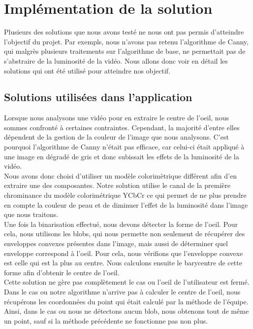 \section{Implémentation de la solution}
Plusieurs des solutions que nous avons testé ne nous ont pas permis d'atteindre l'objectif du projet.
Par exempls, nous n'avons pas retenu l'algorithme de Canny, qui malgrès plusieurs traitements sur l'algorithme
de base, ne permettait pas de s'abstraire de la luminosité de la vidéo.
Nous allons donc voir en détail les solutions qui ont été utilisé pour atteindre nos objectif.

\subsection{Solutions utilisées dans l'application}
Lorsque nous analysons une vidéo pour en extraire le centre de l'oeil, nous sommes confronté à certaines contraintes.
Cependant, la majorité d'entre elles dépendent de la gestion de la couleur de l'image que nous analysons. C'est
pourquoi l'algorithme de Canny n'était pas efficace, car celui-ci était appliqué à une image en dégradé de gris
et donc subissait les effets de la luminosité de la vidéo.\\

Nous avons donc choisi d'utiliser un modèle colorimètrique différent afin d'en extraire une des composantes.
Notre solution utilise le canal de la première chrominance du modèle colorimétrique YCbCr ce qui permet 
de ne plus prendre en compte la couleur de peau et de diminuer l'effet de la luminosité dans l'image que nous traitons.\\


Une fois la binarisation effectué, nous devons détecter la forme de l'oeil. Pour cela, nous utilisons les blobs, qui nous
permette non seulement de récupérer des enveloppes convexes présentes dans l'image, mais aussi de déterminer quel enveloppe
correspond à l'oeil. Pour cela, nous vérifions que l'enveloppe convexe est celle qui est la plus au centre.
Nous calculons ensuite le barycentre de cette forme afin d'obtenir le centre de l'oeil.\\

Cette solution ne gère pas complètement le cas ou l'oeil de l'utilisateur est fermé. Dans le cas ou notre algorithme
n'arrive pas à calculer le centre de l'oeil, nous récupérons les coordonnées du point qui était calculé par la méthode 
de l'équipe. Ainsi, dans le cas ou nous ne détectons aucun blob, nous obtenons tout de même un point, sauf si la méthode 
précédente ne fonctionne pas non plus.

